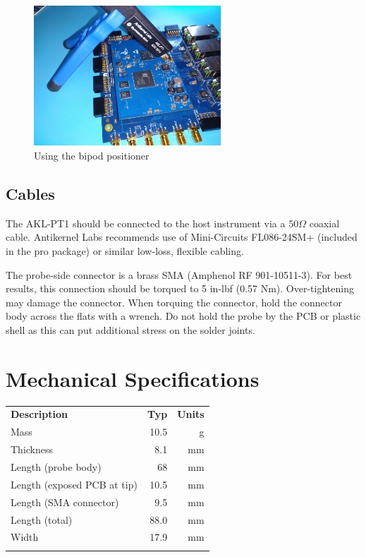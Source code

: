 \documentclass[11pt]{article}
\newcommand{\thinhline}{\Xhline{1\arrayrulewidth}}
\newcommand{\thickhline}{\Xhline{2.5\arrayrulewidth}}
\begin{document}
\begin{figure}[h!]
\centering
\includegraphics[width=7cm]{bipod-usage.jpg}
\caption{Using the bipod positioner}
\end{figure}

\FloatBarrier
\subsection{Cables}

The AKL-PT1 should be connected to the host instrument via a $50 \Omega$ coaxial cable. Antikernel Labs recommends use
of Mini-Circuits FL086-24SM+ (included in the pro package) or similar low-loss, flexible cabling.

The probe-side connector is a brass SMA (Amphenol RF 901-10511-3). For best results, this connection should be torqued
to 5 in-lbf (0.57 Nm). Over-tightening may damage the connector. When torquing the connector, hold the connector body
across the flats with a wrench. Do not hold the probe by the PCB or plastic shell as this can put additional stress on
the solder joints.

\pagebreak

\section{Mechanical Specifications}

\begin{tabularx}{10cm}{Xrr}
\thickhline
\textbf{Description} & \textbf{Typ} & \textbf{Units} \\
\thickhline
Mass & 10.5 & g\\
\thinhline
Thickness & 8.1 & mm\\
\thinhline
Length (probe body) & 68 & mm\\
\thinhline
Length (exposed PCB at tip) & 10.5 & mm\\
\thinhline
Length (SMA connector) & 9.5 & mm\\
\thinhline
Length (total) & 88.0 & mm\\
\thinhline
Width & 17.9 & mm\\
\thickhline
\end{tabularx}
\end{document}
